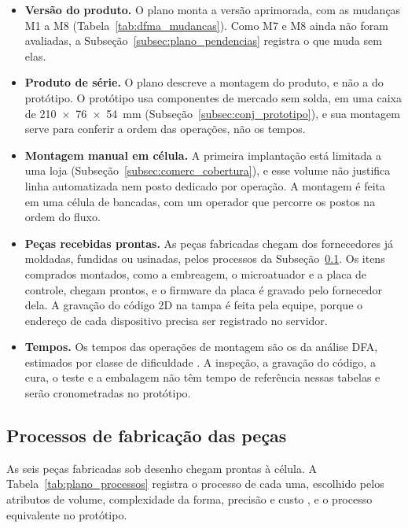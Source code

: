 \begin{itemize}
  \item \textbf{Versão do produto.} O plano monta a versão aprimorada, com as mudanças M1 a M8 (Tabela~\ref{tab:dfma_mudancas}). Como M7 e M8 ainda não foram avaliadas, a Subseção~\ref{subsec:plano_pendencias} registra o que muda sem elas.

  \item \textbf{Produto de série.} O plano descreve a montagem do produto, e não a do protótipo. O protótipo usa componentes de mercado sem solda, em uma caixa de 210~$\times$~76~$\times$~54~mm (Subseção~\ref{subsec:conj_prototipo}), e sua montagem serve para conferir a ordem das operações, não os tempos.

  \item \textbf{Montagem manual em célula.} A primeira implantação está limitada a uma loja (Subseção~\ref{subsec:comerc_cobertura}), e esse volume não justifica linha automatizada nem posto dedicado por operação. A montagem é feita em uma célula de bancadas, com um operador que percorre os postos na ordem do fluxo.

  \item \textbf{Peças recebidas prontas.} As peças fabricadas chegam dos fornecedores já moldadas, fundidas ou usinadas, pelos processos da Subseção~\ref{subsec:plano_processos}. Os itens comprados montados, como a embreagem, o microatuador e a placa de controle, chegam prontos, e o firmware da placa é gravado pelo fornecedor dela. A gravação do código 2D na tampa é feita pela equipe, porque o endereço de cada dispositivo precisa ser registrado no servidor.

  \item \textbf{Tempos.} Os tempos das operações de montagem são os da análise DFA, estimados por classe de dificuldade \cite{boothroyd2011product}. A inspeção, a gravação do código, a cura, o teste e a embalagem não têm tempo de referência nessas tabelas e serão cronometradas no protótipo.
\end{itemize}

\subsection{Processos de fabricação das peças}
\label{subsec:plano_processos}

As seis peças fabricadas sob desenho chegam prontas à célula. A Tabela~\ref{tab:plano_processos} registra o processo de cada uma, escolhido pelos atributos de volume, complexidade da forma, precisão e custo \cite{rozenfeld2006gestao}, e o processo equivalente no protótipo.

